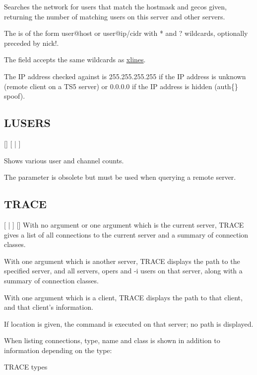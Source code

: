 	Searches the network for users that match the hostmask and gecos given,
	returning the number of matching users on this server and other
	servers.

	The  is of the form user@host or user@ip/cidr
	with * and ? wildcards, optionally preceded by nick!.

	The  field accepts the same wildcards as
	\hyperref[XLINES]{xlines}.

	The IP address checked against is 255.255.255.255 if the IP address is
	unknown (remote client on a TS5 server) or 0.0.0.0 if the IP address is
	hidden (auth\{\} spoof).

\subsection{LUSERS}

 [] [ | ]

	Shows various user and channel counts.

	The  parameter is obsolete but must be used when
	querying a remote server.

\subsection{TRACE}

 [ | ] []
	With no argument or one argument which is the current server,
	TRACE gives a list of all connections to the current server
	and a summary of connection classes.

	With one argument which is another server, TRACE displays the path
	to the specified server, and all servers, opers and -{}i users
	on that server, along with a summary of connection classes.

	With one argument which is a client, TRACE displays the
	path to that client, and that client's information.

	If location is given, the command is executed on that server;
	no path is displayed.

	When listing connections, type, name and class is shown
	in addition to information depending on the type:

{\sc TRACE types}
\nopagebreak

